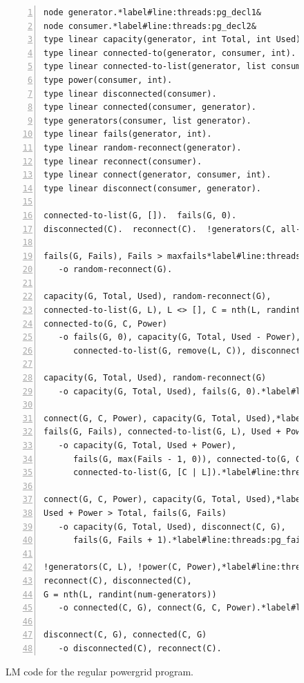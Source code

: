 \begin{figure}[h!]
\begin{Verbatim}[numbers=left,fontsize=\scriptsize,commandchars=*\#\&]
node generator.*label#line:threads:pg_decl1&
node consumer.*label#line:threads:pg_decl2&
type linear capacity(generator, int Total, int Used).
type linear connected-to(generator, consumer, int).
type linear connected-to-list(generator, list consumer).
type power(consumer, int).
type linear disconnected(consumer).
type linear connected(consumer, generator).
type generators(consumer, list generator).
type linear fails(generator, int).
type linear random-reconnect(generator).
type linear reconnect(consumer).
type linear connect(generator, consumer, int).
type linear disconnect(consumer, generator).

connected-to-list(G, []).  fails(G, 0).
disconnected(C).  reconnect(C).  !generators(C, all-generators).

fails(G, Fails), Fails > maxfails*label#line:threads:pg_recon1&
   -o random-reconnect(G).

capacity(G, Total, Used), random-reconnect(G),
connected-to-list(G, L), L <> [], C = nth(L, randint(length(L))),
connected-to(G, C, Power)
   -o fails(G, 0), capacity(G, Total, Used - Power),
      connected-to-list(G, remove(L, C)), disconnect(C, G).

capacity(G, Total, Used), random-reconnect(G)
   -o capacity(G, Total, Used), fails(G, 0).*label#line:threads:pg_recon2&

connect(G, C, Power), capacity(G, Total, Used),*label#line:threads:pg_gen1&
fails(G, Fails), connected-to-list(G, L), Used + Power <= Total
   -o capacity(G, Total, Used + Power),
      fails(G, max(Fails - 1, 0)), connected-to(G, C, Power),
      connected-to-list(G, [C | L]).*label#line:threads:pg_gen2&

connect(G, C, Power), capacity(G, Total, Used),*label#line:threads:pg_fail1&
Used + Power > Total, fails(G, Fails)
   -o capacity(G, Total, Used), disconnect(C, G),
      fails(G, Fails + 1).*label#line:threads:pg_fail2&

!generators(C, L), !power(C, Power),*label#line:threads:pg_connect1&
reconnect(C), disconnected(C),
G = nth(L, randint(num-generators))
   -o connected(C, G), connect(G, C, Power).*label#line:threads:pg_connect2&

disconnect(C, G), connected(C, G)
   -o disconnected(C), reconnect(C).
\end{Verbatim}
\caption{LM code for the regular powergrid program.}
\label{code:threads:powergrid}
\end{figure}

